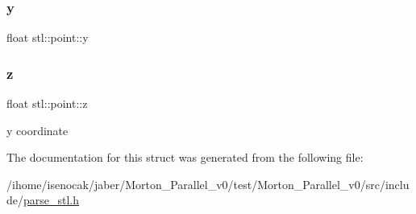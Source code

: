 \subsubsection{\texorpdfstring{y}{y}}
{\footnotesize\ttfamily float stl\+::point\+::y}

\mbox{\label{structstl_1_1point_aa72d43418ec8747b27a97b1e4935c67d}} 
\subsubsection{\texorpdfstring{z}{z}}
{\footnotesize\ttfamily float stl\+::point\+::z}

y coordinate 

The documentation for this struct was generated from the following file\+:\begin{DoxyCompactItemize}
\item 
/ihome/isenocak/jaber/\+Morton\+\_\+\+Parallel\+\_\+v0/test/\+Morton\+\_\+\+Parallel\+\_\+v0/src/include/\mbox{\hyperlink{parse__stl_8h}{parse\+\_\+stl.\+h}}\end{DoxyCompactItemize}
